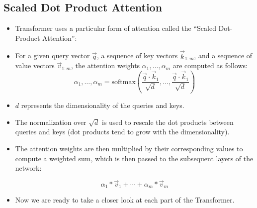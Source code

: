 \subsection{Scaled Dot Product Attention}
\begin{itemize}
  \item  Transformer uses a particular form of attention called the “Scaled Dot-Product Attention”:

  \item For a given query vector $\vec{q}$, a sequence of key vectors $\vec{k}_{1:m}$, and a sequence of value vectors $\vec{v}_{1:m}$,  the attention weights $\alpha_1,\dots,\alpha_m$  are computed as follows:
  \begin{displaymath}
    \alpha_1,\dots,\alpha_m = \text{softmax}\left(\frac{\vec{q} \cdot \vec{k}_{1}}{\sqrt{d}}, \dots,\frac{\vec{q} \cdot \vec{k}_{1}}{\sqrt{d}}\right)
  \end{displaymath}
 \item $d$ represents the dimensionality of the queries and keys.

  \item The normalization over $\sqrt{d}$ is used to rescale the dot products between queries and keys (dot products tend to grow with the dimensionality).

  \item The attention weights are then multiplied by their corresponding values to compute a weighted sum, which is then passed to the subsequent layers of the network:

  \begin{displaymath}
   \alpha_1*\vec{v}_1+\cdots+\alpha_m*\vec{v}_m
  \end{displaymath}

 \item Now we are ready to take a closer look at each part of the Transformer.


\end{itemize}



